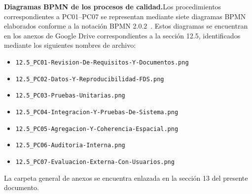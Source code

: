 \textbf{Diagramas BPMN de los procesos de calidad.}\enspace Los procedimientos correspondientes a PC01--PC07 se representan mediante siete diagramas BPMN elaborados conforme a la notación BPMN 2.0.2~\cite{omg2013bpmn}. Estos diagramas se encuentran en los anexos de Google Drive correspondientes a la sección 12.5, identificados mediante los siguientes nombres de archivo:

\begin{itemize}
    \item \texttt{12.5\_PC01-Revision-De-Requisitos-Y-Documentos.png}
    \item \texttt{12.5\_PC02-Datos-Y-Reproducibilidad-FDS.png}
    \item \texttt{12.5\_PC03-Pruebas-Unitarias.png}
    \item \texttt{12.5\_PC04-Integracion-Y-Pruebas-De-Sistema.png}
    \item \texttt{12.5\_PC05-Agregacion-Y-Coherencia-Espacial.png}
    \item \texttt{12.5\_PC06-Auditoria-Interna.png}
    \item \texttt{12.5\_PC07-Evaluacion-Externa-Con-Usuarios.png}
\end{itemize}

La carpeta general de anexos se encuentra enlazada en la sección 13 del presente documento.
